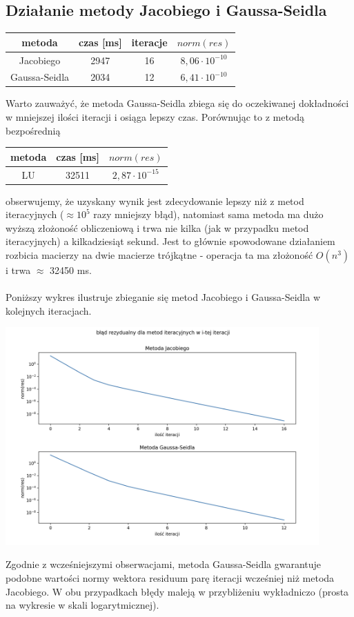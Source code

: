 \documentclass{article}
\begin{document}
\subsection{Działanie metody Jacobiego i Gaussa-Seidla}
\begin{center}
\begin{tabular}{ c | c c c}
 metoda & czas [ms] & iteracje & $norm(res)$ \\ 
\hline
 Jacobiego & 2947 & 16 & $8,06 \cdot 10^{-10}$\\  
 Gaussa-Seidla & 2034 & 12 & $6,41 \cdot 10^{-10} $  
\end{tabular}
\end{center}
Warto zauważyć, że metoda Gaussa-Seidla zbiega się do oczekiwanej dokładności w mniejszej ilości iteracji
i osiąga lepszy czas.  Porównując to z metodą bezpośrednią
\begin{center}
\begin{tabular}{ c | c c}
 metoda & czas [ms] & $norm(res)$ \\ 
\hline
 LU & 32511 & $2,87 \cdot 10^{-15}$\\  
\end{tabular}
\end{center}
obserwujemy, że uzyskany wynik jest zdecydowanie lepszy niż z metod iteracyjnych ($\approx 10^5$ razy mniejszy błąd), 
natomiast sama metoda ma dużo wyższą złożoność obliczeniową i trwa nie kilka (jak w przypadku metod iteracyjnych) a kilkadziesiąt sekund.  Jest to głównie spowodowane działaniem rozbicia
macierzy na dwie macierze trójkątne - operacja ta ma złożoność $O(n^3)$ i trwa  $\approx$ 32450 ms.
\\\\
Poniższy wykres ilustruje zbieganie się metod Jacobiego i Gaussa-Seidla w kolejnych iteracjach.
\begin{center}
	\includegraphics[width=12cm]{z2_residuum}
\end{center}
Zgodnie z wcześniejszymi obserwacjami, metoda Gaussa-Seidla gwarantuje podobne wartości normy wektora residuum parę iteracji wcześniej niż metoda Jacobiego.  W obu przypadkach błędy 
maleją w przybliżeniu wykładniczo (prosta na wykresie w skali logarytmicznej).
\end{document}
